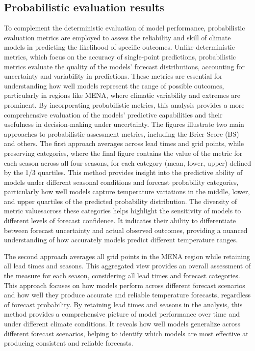 \subsection{Probabilistic evaluation results}

To complement the deterministic evaluation of model performance, probabilistic evaluation metrics are employed to assess the reliability and skill of climate models in predicting the likelihood of specific outcomes. Unlike deterministic metrics, which focus on the accuracy of single-point predictions, probabilistic metrics evaluate the quality of the models’ forecast distributions, accounting for uncertainty and variability in predictions. These metrics are essential for understanding how well models represent the range of possible outcomes, particularly in regions like MENA, where climatic variability and extremes are prominent. By incorporating probabilistic metrics, this analysis provides a more comprehensive evaluation of the models’ predictive capabilities and their usefulness in decision-making under uncertainty.
The figures illustrate two main approaches to probabilistic assessment metrics, including the Brier Score (BS) and others. The first approach averages across lead times and grid points, while preserving categories, where the final figure contains the value of the metric for each season across all four seasons, for each category (mean, lower, upper) defined by the 1/3 quartiles. This method provides insight into the predictive ability of models under different seasonal conditions and forecast probability categories, particularly how well models capture temperature variations in the middle, lower, and upper quartiles of the predicted probability distribution. The diversity of metric values ​​across these categories helps highlight the sensitivity of models to different levels of forecast confidence. It indicates their ability to differentiate between forecast uncertainty and actual observed outcomes, providing a nuanced understanding of how accurately models predict different temperature ranges.

The second approach averages all grid points in the MENA region while retaining all lead times and seasons. This aggregated view provides an overall assessment of the measure for each season, considering all lead times and forecast categories. This approach focuses on how models perform across different forecast scenarios and how well they produce accurate and reliable temperature forecasts, regardless of forecast probability. By retaining lead times and seasons in the analysis, this method provides a comprehensive picture of model performance over time and under different climate conditions. It reveals how well models generalize across different forecast scenarios, helping to identify which models are most effective at producing consistent and reliable forecasts.
